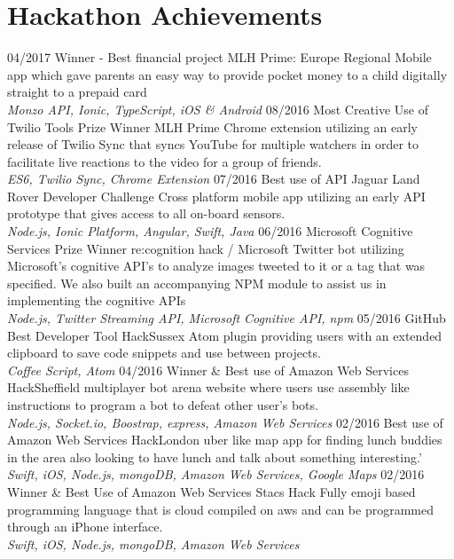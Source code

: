 \documentclass[]{friggeri-cv}
\begin{document}
\section{Hackathon Achievements}
\begin{entrylist}
  \entry
    {04/2017}
    {Winner - Best financial project}
    {MLH Prime: Europe Regional}
    {Mobile app which gave parents an easy way to provide pocket money to a child digitally straight to a prepaid card\\
   	\emph{Monzo API, Ionic, TypeScript, iOS \& Android}}
  \entry
    {08/2016}
    {Most Creative Use of Twilio Tools Prize Winner}
    {MLH Prime}
    {Chrome extension utilizing an early release of Twilio Sync that syncs YouTube for multiple watchers in order to facilitate live reactions to the video for a group of friends.\\
   	\emph{ES6, Twilio Sync, Chrome Extension}}
    \entry
    {07/2016}
    {Best use of API}
    {Jaguar Land Rover Developer Challenge}
    {Cross platform mobile app utilizing an early API prototype that gives access to all on-board sensors.\\
    \emph{Node.js, Ionic Platform, Angular, Swift, Java}}
        \entry
    {06/2016}
    {Microsoft Cognitive Services Prize Winner}
    {re:cognition hack / Microsoft}
    {Twitter bot utilizing Microsoft's cognitive API's to analyze images tweeted to it or a tag that was specified. We also built an accompanying NPM module to assist us in implementing the cognitive APIs\\
    \emph{Node.js, Twitter Streaming API, Microsoft Cognitive API, npm}}
        \entry
    {05/2016}
    {GitHub Best Developer Tool}
    {HackSussex}
    {Atom plugin providing users with an extended clipboard to save code snippets and use between projects. \\
    \emph{Coffee Script, Atom}}
        \entry
    {04/2016}
    {Winner \& Best use of Amazon Web Services}
    {HackSheffield}
    {multiplayer bot arena website where users use assembly like instructions to program a bot to defeat other user's bots.\\
\emph{Node.js, Socket.io, Boostrap, express, Amazon Web Services}}
        \entry
    {02/2016}
    {Best use of Amazon Web Services}
    {HackLondon}
    {uber like map app for finding lunch buddies in the area also looking to have lunch and talk about something interesting.'\\
    \emph{Swift, iOS, Node.js, mongoDB, Amazon Web Services, Google Maps}}
        \entry
    {02/2016}
    {Winner \& Best Use of Amazon Web Services}
    {Stacs Hack}
    {Fully emoji based programming language that is cloud compiled on aws and can be programmed through an iPhone interface.\\
    \emph{Swift, iOS, Node.js, mongoDB, Amazon Web Services}}

    \end{entrylist}
\end{document}
